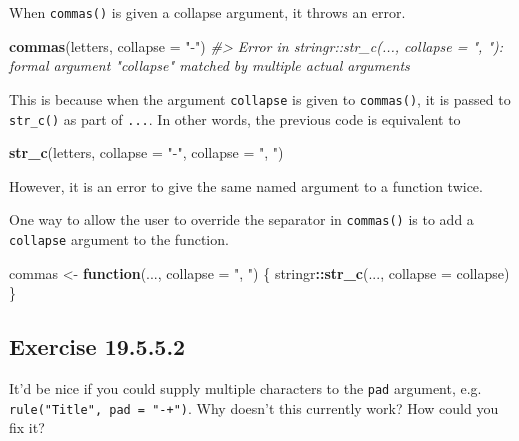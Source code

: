 \documentclass[]{book}
\newenvironment{Shaded}{\begin{snugshade}}{\end{snugshade}}
\newcommand{\CommentTok}[1]{\textcolor[rgb]{0.56,0.35,0.01}{\textit{#1}}}
\newcommand{\ControlFlowTok}[1]{\textcolor[rgb]{0.13,0.29,0.53}{\textbf{#1}}}
\newcommand{\DataTypeTok}[1]{\textcolor[rgb]{0.13,0.29,0.53}{#1}}
\newcommand{\KeywordTok}[1]{\textcolor[rgb]{0.13,0.29,0.53}{\textbf{#1}}}
\newcommand{\NormalTok}[1]{#1}
\newcommand{\OperatorTok}[1]{\textcolor[rgb]{0.81,0.36,0.00}{\textbf{#1}}}
\newcommand{\StringTok}[1]{\textcolor[rgb]{0.31,0.60,0.02}{#1}}
\theoremstyle{plain}
\theoremstyle{remark}
\begin{document}
When \texttt{commas()} is given a collapse argument, it throws an error.

\begin{Shaded}
\begin{Highlighting}[]
\KeywordTok{commas}\NormalTok{(letters, }\DataTypeTok{collapse =} \StringTok{"-"}\NormalTok{)}
\CommentTok{#> Error in stringr::str_c(..., collapse = ", "): formal argument "collapse" matched by multiple actual arguments}
\end{Highlighting}
\end{Shaded}

This is because when the argument \texttt{collapse} is given to
\texttt{commas()}, it is passed to \texttt{str\_c()} as part of
\texttt{...}. In other words, the previous code is equivalent to

\begin{Shaded}
\begin{Highlighting}[]
\KeywordTok{str_c}\NormalTok{(letters, }\DataTypeTok{collapse =} \StringTok{"-"}\NormalTok{, }\DataTypeTok{collapse =} \StringTok{", "}\NormalTok{)}
\end{Highlighting}
\end{Shaded}

However, it is an error to give the same named argument to a function
twice.

One way to allow the user to override the separator in \texttt{commas()}
is to add a \texttt{collapse} argument to the function.

\begin{Shaded}
\begin{Highlighting}[]
\NormalTok{commas <-}\StringTok{ }\ControlFlowTok{function}\NormalTok{(..., }\DataTypeTok{collapse =} \StringTok{", "}\NormalTok{) \{}
\NormalTok{  stringr}\OperatorTok{::}\KeywordTok{str_c}\NormalTok{(..., }\DataTypeTok{collapse =}\NormalTok{ collapse)}
\NormalTok{\}}
\end{Highlighting}
\end{Shaded}

\hypertarget{exercise-19.5.5.2}{%
\subsection*{\texorpdfstring{Exercise
{19.5.5.2}}{Exercise 19.5.5.2}}\label{exercise-19.5.5.2}}

It'd be nice if you could supply multiple characters to the \texttt{pad}
argument, e.g. \texttt{rule("Title",\ pad\ =\ "-+")}. Why doesn't this
currently work? How could you fix it?
\end{document}
